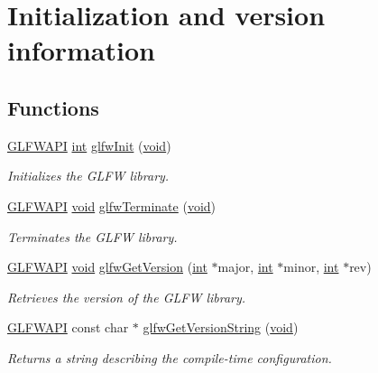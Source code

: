 \hypertarget{group__init}{\section{Initialization and version information}
\label{group__init}
}
\subsection*{Functions}
\begin{DoxyCompactItemize}
\item 
\hyperlink{glfw3_8h_a56da5036b2cc259351ae22fd6439bb47}{G\-L\-F\-W\-A\-P\-I} \hyperlink{wglew_8h_a500a82aecba06f4550f6849b8099ca21}{int} \hyperlink{group__init_gab41771f0215a2e0afb4cf1cf98082d40}{glfw\-Init} (\hyperlink{wglew_8h_aeea6e3dfae3acf232096f57d2d57f084}{void})
\begin{DoxyCompactList}\small\item\em Initializes the G\-L\-F\-W library. \end{DoxyCompactList}\item 
\hyperlink{glfw3_8h_a56da5036b2cc259351ae22fd6439bb47}{G\-L\-F\-W\-A\-P\-I} \hyperlink{wglew_8h_aeea6e3dfae3acf232096f57d2d57f084}{void} \hyperlink{group__init_gafd90e6fd4819ea9e22e5e739519a6504}{glfw\-Terminate} (\hyperlink{wglew_8h_aeea6e3dfae3acf232096f57d2d57f084}{void})
\begin{DoxyCompactList}\small\item\em Terminates the G\-L\-F\-W library. \end{DoxyCompactList}\item 
\hyperlink{glfw3_8h_a56da5036b2cc259351ae22fd6439bb47}{G\-L\-F\-W\-A\-P\-I} \hyperlink{wglew_8h_aeea6e3dfae3acf232096f57d2d57f084}{void} \hyperlink{group__init_ga2402c7824ac0194c13722790ff9559ff}{glfw\-Get\-Version} (\hyperlink{wglew_8h_a500a82aecba06f4550f6849b8099ca21}{int} $\ast$major, \hyperlink{wglew_8h_a500a82aecba06f4550f6849b8099ca21}{int} $\ast$minor, \hyperlink{wglew_8h_a500a82aecba06f4550f6849b8099ca21}{int} $\ast$rev)
\begin{DoxyCompactList}\small\item\em Retrieves the version of the G\-L\-F\-W library. \end{DoxyCompactList}\item 
\hyperlink{glfw3_8h_a56da5036b2cc259351ae22fd6439bb47}{G\-L\-F\-W\-A\-P\-I} const char $\ast$ \hyperlink{group__init_ga4b9092ac5eace57d94d3cd551d6b8ded}{glfw\-Get\-Version\-String} (\hyperlink{wglew_8h_aeea6e3dfae3acf232096f57d2d57f084}{void})
\begin{DoxyCompactList}\small\item\em Returns a string describing the compile-\/time configuration. \end{DoxyCompactList}\end{DoxyCompactItemize}
